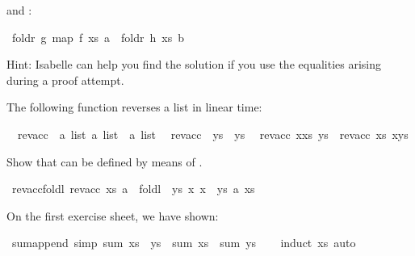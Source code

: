 \begin{isabellebody}
\begin{isamarkuptext}
and :%
\end{isamarkuptext}%
\isamarkuptrue%
\ {\isachardoublequote}foldr\ g\ {\isacharparenleft}map\ f\ xs{\isacharparenright}\ a\ {\isacharequal}\ foldr\ h\ xs\ b{\isachardoublequote}\isamarkupfalse%
\isamarkupfalse%
%
\begin{isamarkuptext}%
Hint: Isabelle can help you find the solution if you use the
equalities arising during a proof attempt.%
\end{isamarkuptext}%
\isamarkuptrue%
%
\begin{isamarkuptext}%
The following function  reverses a list in linear time:%
\end{isamarkuptext}%
\isamarkuptrue%
\isanewline
\ \ rev{\isacharunderscore}acc\ {\isacharcolon}{\isacharcolon}\ {\isachardoublequote}{\isacharbrackleft}{\isacharprime}a\ list{\isacharcomma}\ {\isacharprime}a\ list{\isacharbrackright}\ {\isasymRightarrow}\ {\isacharprime}a\ list{\isachardoublequote}\isanewline
\isamarkupfalse%
\isanewline
\ \ {\isachardoublequote}rev{\isacharunderscore}acc\ {\isacharbrackleft}{\isacharbrackright}\ ys\ {\isacharequal}\ ys{\isachardoublequote}\isanewline
\ \ {\isachardoublequote}rev{\isacharunderscore}acc\ {\isacharparenleft}x{\isacharhash}xs{\isacharparenright}\ ys\ {\isacharequal}\ {\isacharparenleft}rev{\isacharunderscore}acc\ xs\ {\isacharparenleft}x{\isacharhash}ys{\isacharparenright}{\isacharparenright}{\isachardoublequote}\isamarkupfalse%
%
\begin{isamarkuptext}%
Show that  can be defined by means of .%
\end{isamarkuptext}%
\isamarkuptrue%
\ rev{\isacharunderscore}acc{\isacharunderscore}foldl{\isacharcolon}\ {\isachardoublequote}rev{\isacharunderscore}acc\ xs\ a\ {\isacharequal}\ foldl\ {\isacharparenleft}{\isasymlambda}\ ys\ x{\isachardot}\ x\ {\isacharhash}\ ys{\isacharparenright}\ a\ xs{\isachardoublequote}\isamarkupfalse%
\isamarkupfalse%
%
\begin{isamarkuptext}%
On the first exercise sheet, we have shown:%
\end{isamarkuptext}%
\isamarkuptrue%
\ sum{\isacharunderscore}append\ {\isacharbrackleft}simp{\isacharbrackright}{\isacharcolon}\ {\isachardoublequote}sum\ {\isacharparenleft}xs\ {\isacharat}\ ys{\isacharparenright}\ {\isacharequal}\ sum\ xs\ {\isacharplus}\ sum\ ys{\isachardoublequote}\isanewline
\ \ \isamarkupfalse%
\ {\isacharparenleft}induct\ xs{\isacharparenright}\ auto\isamarkupfalse%

\end{isabellebody}
